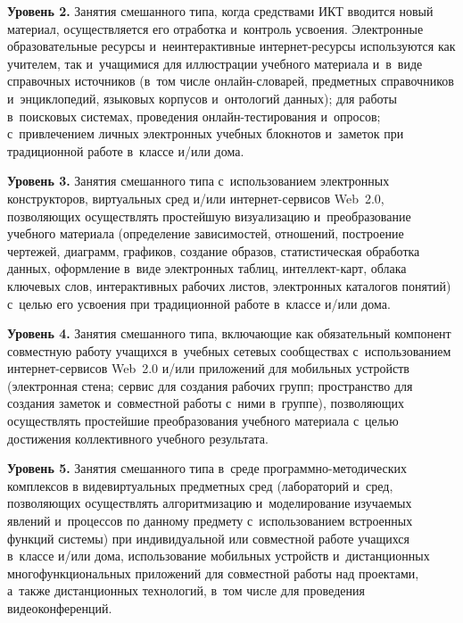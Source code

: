 \begin{multicols}{2}
\smallskip

  \textbf{Уровень 2.} Занятия смешанного типа, когда средствами ИКТ вводится новый
материал, осуще\-ствляется его отработка и~контроль усвоения. Электронные
образовательные ресурсы и~неинтерактивные
ин\-тер\-нет-ре\-сур\-сы используются как учителем, так и~учащимися для иллюстрации
учебного
материала и~в~виде справочных источников (в~том чис\-ле он\-лайн-сло\-ва\-рей,
предметных
справочников и~энциклопедий, языковых корпусов и~онтологий данных); для работы
в~поисковых сис\-те\-мах, проведения он\-лайн-тес\-ти\-ро\-ва\-ния и~опросов; с~привлечением
личных электронных учебных блокнотов и~заметок при традиционной работе в~классе и/или
дома.

\smallskip

  \textbf{Уровень 3.} Занятия смешанного типа с~использованием электронных конструкторов,
виртуальных сред и/или ин\-тер\-нет-сер\-ви\-сов Web~2.0, позволяющих осуществлять
простейшую визуализацию и~преобразование учебного материала (определение зависимостей,
отношений, построение чертежей, диаграмм, графиков, создание образов, статистическая
обработка данных, оформление в~виде электронных таблиц, ин\-тел\-лект-карт, облака
ключевых слов, интерактивных рабочих листов, электронных каталогов понятий) с~целью его
усвоения при традиционной работе в~классе и/или дома.

\smallskip

  \textbf{Уровень 4.} Занятия смешанного типа, включающие как обязательный компонент
совместную работу учащихся в~учебных сетевых сообществах с~использованием
  ин\-тер\-нет-сер\-ви\-сов Web~2.0 и/или приложений для мобильных устройств (электронная
стена; сервис для создания рабочих групп; пространство для создания заметок и~совместной
работы с~ними в~группе), позволяющих осуществлять простейшие преобразования учебного
материала с~целью достижения коллективного учебного результата.

\smallskip

  \textbf{Уровень 5.} Занятия смешанного типа в~среде
  про\-грам\-мно-методических комплексов
в виде\linebreak  виртуальных предметных сред (лабораторий и~сред, позволяющих осуществлять
алгоритмизацию и~моделирование изучаемых явлений и~процессов по данному предмету
с~использованием встроенных функций системы) при индивидуальной или совместной работе
учащихся в~классе и/или дома, использование мобильных устройств
и~дистанционных многофункциональных приложений 
для совместной работы над проектами, а~также дистанционных технологий, 
в~том числе для
проведения видеоконференций.


\end{multicols}
